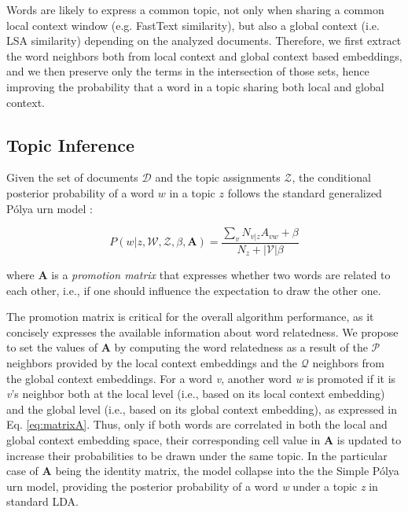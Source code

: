 \documentclass[letterpaper]{article}
\begin{document}
Words are likely to express a common topic, not only when sharing a common local context window (e.g. FastText similarity), but also a global context (i.e. LSA similarity) depending on the analyzed documents.
Therefore, we first extract the word neighbors both from local context and global context based embeddings, and we then preserve only the terms in the intersection of those sets, hence improving the probability that a word in a topic sharing both local and global context.

\subsection{Topic Inference}

Given the set of documents $\mathcal{D}$ and the topic assignments $\mathcal{Z}$, the conditional posterior probability of a word $w$ in a topic $z$ follows the standard generalized P\'{o}lya urn model \cite{Mimno11}:

\begin{equation}
  P(w |z,\mathcal{W},\mathcal{Z},\beta,\mathbf{A}) = \frac{\sum_{v} N_{v|z} A_{vw} + \beta}{N_z + |\mathcal{V}|\beta}
\label{eq:gpumodel}
\end{equation}

where $\mathbf{A}$ is a \textit{promotion matrix} that expresses whether two words are related to each other, i.e., if one should influence the expectation to draw the other one.

The promotion matrix is critical for the overall algorithm performance, as it concisely expresses the available information about word relatedness. We propose to set the values of $\mathbf{A}$ by computing the word relatedness as a result of the $\mathcal{P}$ neighbors provided by the local context embeddings and the $\mathcal{Q}$ neighbors from the global context embeddings. 
For a word \textit{v}, another word \textit{w} is promoted if it is \textit{v}'s neighbor both at the local level (i.e., based on its local context embedding) and the global level (i.e., based on its global context embedding), as expressed in Eq. \ref{eq:matrixA}. Thus, only if both words are correlated in both the local and global context embedding space, their corresponding cell value in $\mathbf{A}$ is updated to increase their probabilities to be drawn under the same topic. 
In the particular case of $\mathbf{A}$ being the identity matrix, the model collapse into the the Simple P\'{o}lya urn model, providing the posterior probability of a word \textit{w} under a topic \textit{z} in standard LDA.
\end{document}
